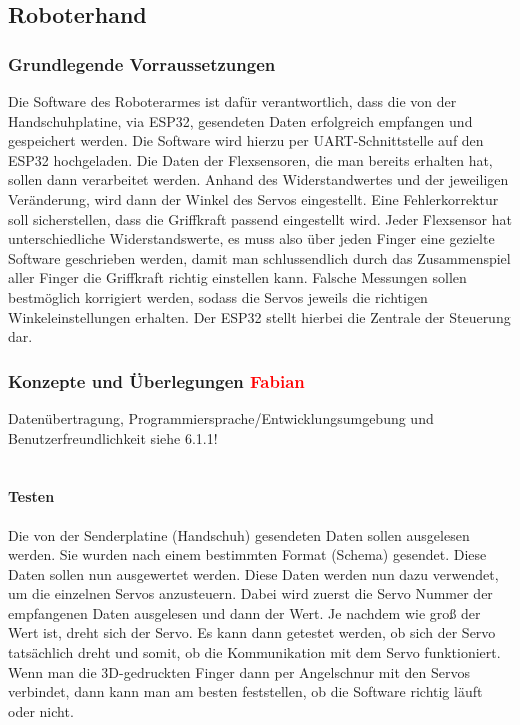 \documentclass[titlepage,12pt,twoside]{article}
\begin{document}
\subsection{Roboterhand}

\subsubsection{Grundlegende Vorraussetzungen}
Die Software des Roboterarmes ist dafür verantwortlich, dass die von der Handschuhplatine, via ESP32, gesendeten Daten 
erfolgreich empfangen und gespeichert werden. Die Software wird hierzu per UART-Schnittstelle auf den ESP32 hochgeladen. 
Die Daten der Flexsensoren, die man bereits erhalten hat, sollen dann verarbeitet werden. Anhand des Widerstandwertes und 
der jeweiligen Veränderung, wird dann der Winkel des Servos eingestellt. Eine Fehlerkorrektur soll sicherstellen, dass die 
Griffkraft passend eingestellt wird. Jeder Flexsensor hat unterschiedliche Widerstandswerte, es muss also über jeden Finger 
eine gezielte Software geschrieben werden, damit man schlussendlich durch das Zusammenspiel aller Finger die Griffkraft 
richtig einstellen kann. Falsche Messungen sollen bestmöglich korrigiert werden, sodass die Servos jeweils die richtigen 
Winkeleinstellungen erhalten. Der ESP32 stellt hierbei die Zentrale der Steuerung dar.

\subsubsection{Konzepte und Überlegungen \textcolor{red}{Fabian}}
Datenübertragung, Programmiersprache/Entwicklungsumgebung und Benutzerfreundlichkeit siehe 6.1.1! \\
\\
\paragraph{Testen}
\hfill \break
\hfill \break
Die von der Senderplatine (Handschuh) gesendeten Daten sollen ausgelesen werden. Sie wurden nach einem bestimmten Format 
(Schema) gesendet. Diese Daten sollen nun ausgewertet werden. Diese Daten werden nun dazu verwendet, um die einzelnen Servos 
anzusteuern. Dabei wird zuerst die Servo Nummer der empfangenen Daten ausgelesen und dann der Wert. Je nachdem wie groß der
Wert ist, dreht sich der Servo. Es kann dann getestet werden, ob sich der Servo tatsächlich dreht und somit, ob die 
Kommunikation mit dem Servo funktioniert. Wenn man die 3D-gedruckten Finger dann per Angelschnur mit den Servos verbindet, 
dann kann man am besten feststellen, ob die Software richtig läuft oder nicht. \\
\\
\end{document}
